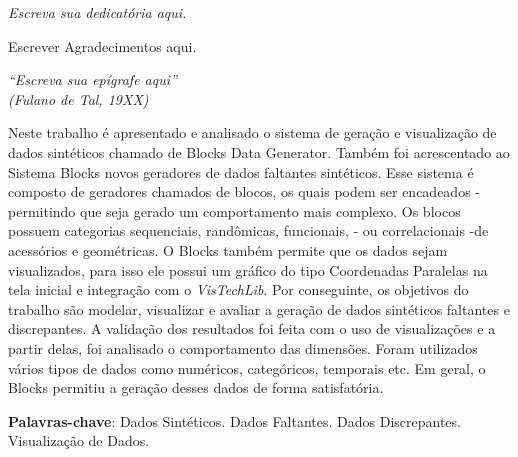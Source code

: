 \documentclass[
	12pt,				%
	openright,			%
	twoside,			%
	a4paper,			%
	english,			%
	brazil				%
	]{abntex2}
\begin{document}
\begin{dedicatoria}
   \vspace*{\fill}
   \centering
   \noindent
   \textit{ Escreva sua dedicatória aqui.} \vspace*{\fill}
\end{dedicatoria}

\begin{agradecimentos}
Escrever Agradecimentos aqui.

\end{agradecimentos}

\begin{epigrafe}
    \vspace*{\fill}
	\begin{flushright}
		\textit{``Escreva sua epígrafe aqui''\\
		(Fulano de Tal, 19XX)}
	\end{flushright}
\end{epigrafe}


\setlength{\absparsep}{18pt} %
\begin{resumo}

	Neste trabalho é apresentado e analisado o sistema de geração e visualização de dados sintéticos chamado de Blocks Data Generator.
	Também foi acrescentado ao Sistema Blocks novos geradores de dados faltantes sintéticos.
	Esse sistema é composto de geradores chamados de blocos, os quais podem ser encadeados - permitindo que seja gerado um comportamento mais complexo.
	Os blocos possuem categorias sequenciais, randômicas, funcionais, - ou correlacionais -de acessórios e geométricas.
	O Blocks também permite que os dados sejam visualizados, para isso ele possui um gráfico do tipo Coordenadas Paralelas na tela inicial e integração com o \emph{VisTechLib}.
	Por conseguinte, os objetivos do trabalho são modelar, visualizar e avaliar a geração de dados sintéticos faltantes e discrepantes.
	A validação dos resultados foi feita com o uso de visualizações e a partir delas, foi analisado o comportamento das dimensões.
	Foram utilizados vários tipos de dados como numéricos, categóricos, temporais etc.
	Em geral, o Blocks permitiu a geração desses dados de forma satisfatória.

 \textbf{Palavras-chave}: Dados Sintéticos. Dados Faltantes. Dados Discrepantes. Visualização de Dados.
\end{resumo}
\end{document}

